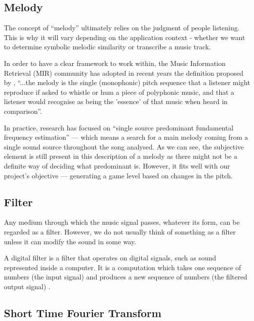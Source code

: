 \vspace{10pt}

\subsection{Melody}

The concept of “melody” ultimately relies on the judgment of people listening. This is why it will vary depending on the application context - whether we want to determine symbolic melodic similarity or transcribe a music track. 

In order to have a clear framework to work within, the Music Information Retrieval (MIR) community has adopted in recent years the definition proposed by \cite{melodydef}, ``...the melody is the single (monophonic) pitch sequence that a listener might reproduce if asked to whistle or hum a piece of polyphonic music, and that a listener would recognise as being the 'essence' of that music when heard in comparison''.

In practice, research has focused on ``single source predominant fundamental frequency estimation'' — which means a search for a main melody coming from a single sound source throughout the song analysed. As we can see, the subjective element is still present in this description of a melody as there might not be a definite way of deciding what predominant is. However, it fits well with our project’s objective — generating a game level based on changes in the pitch.

\vspace{10pt}

\subsection{Filter}

Any medium through which the music signal passes, whatever its form, can be regarded as a filter. However, we do not usually think of something as a filter unless it can modify the sound in some way. 

A digital filter is a filter that operates on digital signals, such as sound represented inside a computer. It is a computation which takes one sequence of numbers (the input signal) and produces a new sequence of numbers (the filtered output signal) \cite{filters}.

\vspace{10pt}

\subsection{Short Time Fourier Transform}

